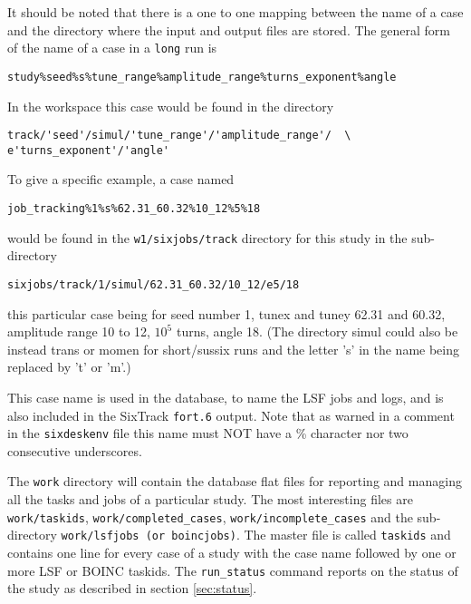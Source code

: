 \documentclass{article}    %
\begin{document}
It should be noted that there is a one to one mapping between the name of a case
and the directory where the input and output files are stored. The general form of
the name of a case in a {\tt long} run is 
\begin{verbatim}
study%seed%s%tune_range%amplitude_range%turns_exponent%angle
\end{verbatim}
In the workspace this case would be found in the directory
\begin{verbatim}
track/'seed'/simul/'tune_range'/'amplitude_range'/  \
e'turns_exponent'/'angle'
\end{verbatim}
To give a specific example, a case named
\begin{verbatim}
job_tracking%1%s%62.31_60.32%10_12%5%18
\end{verbatim} would be found in the {\tt w1/sixjobs/track} directory for 
this study in the sub-directory
\begin{verbatim}
sixjobs/track/1/simul/62.31_60.32/10_12/e5/18
\end{verbatim}
this particular case being for seed number 1, tunex and tuney 62.31 and 60.32,
amplitude range 10 to 12, $10^5$ turns, angle 18. (The directory simul could also
be instead trans or momen for short/sussix runs and the letter 's' in the
name being replaced by 't' or 'm'.)
 
This case name is used in the database, to name the LSF jobs and logs, and is
also included in the SixTrack {\tt fort.6} output. Note that as warned in a
comment in the {\tt sixdeskenv} file this name must
NOT have a \% character nor two consecutive underscores.

The {\tt work} directory will contain the database flat files for reporting
and managing all the tasks and jobs of a particular study.
The most interesting files are {\tt work/taskids}, {\tt work/completed\_cases},
{\tt work/incomplete\_cases} and the sub-directory {\tt work/lsfjobs (or boincjobs)}.
The master file is called {\tt taskids} and contains one line for every case of
a study with the case name followed by one or more LSF or BOINC taskids. The {\tt run\_status}
command reports on the status of the study as described in section \ref{sec:status}.
\end{document}
